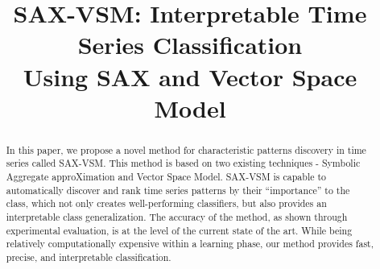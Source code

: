 \documentclass[conference]{IEEEtran}
\begin{document}
%
\title{\huge\textbf{SAX-VSM: Interpretable Time Series Classification\\ Using SAX and Vector Space Model}\vspace{-1ex}}
\author{
 \and
 \vspace{-2ex}}
\bigskip
\maketitle

\bigskip

\begin{abstract}
In this paper, we propose a novel method for characteristic patterns discovery in 
time series called SAX-VSM. This method is based on two existing techniques - 
Symbolic Aggregate approXimation and Vector Space Model. SAX-VSM is capable 
to automatically discover and rank time series patterns by their 
“importance” to the class, which not only creates well-performing classifiers,
but also provides an interpretable class generalization. 
The accuracy of the method, as shown through experimental evaluation, is at the 
level of the current state of the art. 
While being relatively computationally expensive within a learning phase, 
our method provides fast, precise, and interpretable classification.
\end{abstract}
\end{document}
